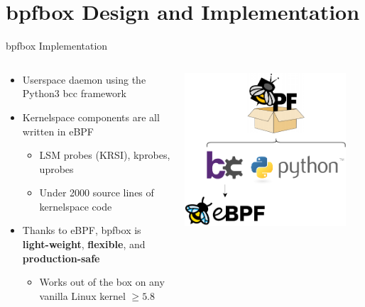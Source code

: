 \documentclass[12pt, dvipsnames, aspectratio=169]{beamer}
\begin{document}
\section{bpfbox Design and Implementation}

\begin{frame}[c]{bpfbox Implementation}
\begin{columns}
    \begin{column}{0.66\textwidth}
        \begin{itemize}
            \item Userspace daemon using the Python3 bcc framework
            \vspace{2em}
            \item Kernelspace components are all written in eBPF
            \begin{itemize}
                \item LSM probes (KRSI), kprobes, uprobes
                \item Under 2000 source lines of kernelspace code
            \end{itemize}
            \vspace{2em}
            \item Thanks to eBPF, bpfbox is \textbf{light-weight}, \textbf{flexible}, and \textbf{production-safe}
            \begin{itemize}
                \item Works out of the box on any vanilla Linux kernel $\ge 5.8$
            \end{itemize}
        \end{itemize}
    \end{column}
    \begin{column}{0.33\textwidth}
        \begin{center}
            \color{black}
            \includegraphics[width=0.9\textwidth]{figs/at-a-glance.pdf}
        \end{center}
        \vspace{2em}
    \end{column}
\end{columns}
\end{frame}
\end{document}
